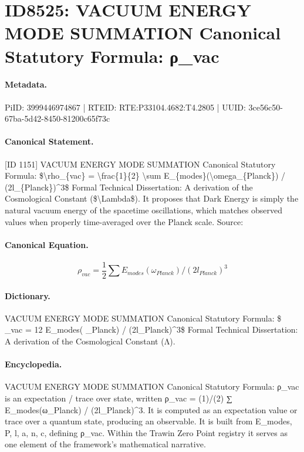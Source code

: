 \section*{ID8525: VACUUM ENERGY MODE SUMMATION Canonical Statutory Formula: ρ\_vac}
\paragraph{Metadata.}
PiID: 3999446974867 | RTEID: RTE:P33104.4682:T4.2805 | UUID: 3ce56c50-67ba-5d42-8450-81200c65f73c

\paragraph{Canonical Statement.}
[ID 1151] VACUUM ENERGY MODE SUMMATION Canonical Statutory Formula: \$\textbackslash{}rho\_\{vac\} = \textbackslash{}frac\{1\}\{2\} \textbackslash{}sum E\_\{modes\}(\textbackslash{}omega\_\{Planck\}) / (2l\_\{Planck\})\textasciicircum{}3\$ Formal Technical Dissertation: A derivation of the Cosmological Constant (\$\textbackslash{}Lambda\$). It proposes that Dark Energy is simply the natural vacuum energy of the spacetime oscillations, which matches observed values when properly time-averaged over the Planck scale. Source:

\paragraph{Canonical Equation.}
\[
\rho_{vac} = \frac{1}{2} \sum E_{modes}(\omega_{Planck}) / (2l_{Planck})^3
\]

\paragraph{Dictionary.}
VACUUM ENERGY MODE SUMMATION Canonical Statutory Formula: \$ \_vac = 12 E\_modes( \_Planck) / (2l\_Planck)\textasciicircum{}3\$ Formal Technical Dissertation: A derivation of the Cosmological Constant (Λ).

\paragraph{Encyclopedia.}
VACUUM ENERGY MODE SUMMATION Canonical Statutory Formula: ρ\_vac is an expectation / trace over state, written ρ\_vac = (1)/(2) ∑ E\_modes(ω\_Planck) / (2l\_Planck)\textasciicircum{}3. It is computed as an expectation value or trace over a quantum state, producing an observable. It is built from E\_modes, P, l, a, n, c, defining ρ\_vac. Within the Trawin Zero Point registry it serves as one element of the framework's mathematical narrative.
